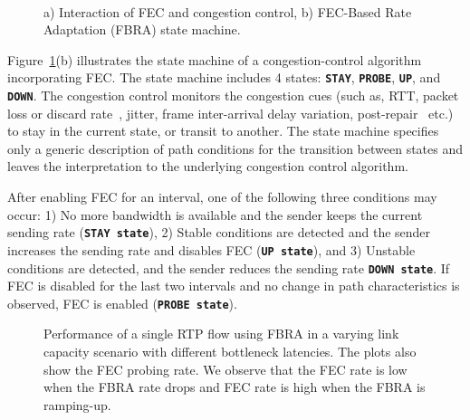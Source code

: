 \begin{figure}
  \centering
   \\
\caption{a) Interaction of FEC and congestion control, b) FEC-Based Rate
Adaptation (FBRA) state machine.}
\label{fig:fecrc-intro}
\end{figure}


Figure~\ref{fig:fecrc-intro}(b) illustrates the state machine of a
congestion-control algorithm incorporating FEC. The state machine includes 4
states: \texttt{\textbf{STAY}}, \texttt{\textbf{PROBE}}, \texttt{\textbf{UP}},
and \texttt{\textbf{DOWN}}. The congestion control monitors the congestion
cues (such as, RTT, packet loss or discard rate~\cite{rfc7002, rfc7097, rfc7243}, jitter, frame inter-arrival
delay variation, post-repair~\cite{rfc5725, draft.xr.post.repair} etc.) to stay in the current state, or transit to
another. The state machine specifies only a generic description of path
conditions for the transition between states and leaves the interpretation to
the underlying congestion control algorithm.

After enabling FEC for an interval, one of the following three conditions may
occur: 1) No more bandwidth is available and the sender keeps the current sending
rate (\texttt{\textbf{STAY state}}), 2) Stable conditions are detected and the
sender increases the sending rate and disables FEC (\texttt{\textbf{UP
state}}), and 3) Unstable conditions are detected, and the sender reduces the
sending rate \texttt{\textbf{DOWN state}}. If FEC is disabled for the last two
intervals and no change in path characteristics is observed, FEC is enabled
(\texttt{\textbf{PROBE state}}).


\begin{figure}
\caption{Performance of a single RTP flow using FBRA in a
varying link capacity scenario with different bottleneck latencies. The plots
also show the FEC probing rate. We observe that the FEC rate is low when the
FBRA rate drops and FEC rate is high when the FBRA is ramping-up.}
\label{fig:fecrc-var}
\end{figure}

